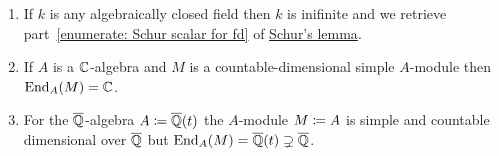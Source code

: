 \begin{example}
  \leavevmode
  \begin{enumerate}
    \item
      If $k$ is any algebraically closed field then $k$ is inifinite and we retrieve part~\ref*{enumerate: Schur scalar for fd} of \hyperref[proposition: schurs lemma for modules]{Schur’s lemma}.
    \item
      If $A$ is a $\mathbb{C}$-algebra and $M$ is a countable-dimensional simple $A$-module then $\operatorname{End}_A(M) = \mathbb{C}$.
    \item
      For the $\overline{\mathbb{Q}}$-algebra $A \coloneqq \overline{\mathbb{Q}}(t)$ the $A$-module $M \coloneqq A$ is simple and countable dimensional over $\overline{\mathbb{Q}}$ but $\operatorname{End}_A(M) = \overline{\mathbb{Q}}(t) \supsetneq \overline{\mathbb{Q}}$.
  \end{enumerate}
\end{example}




